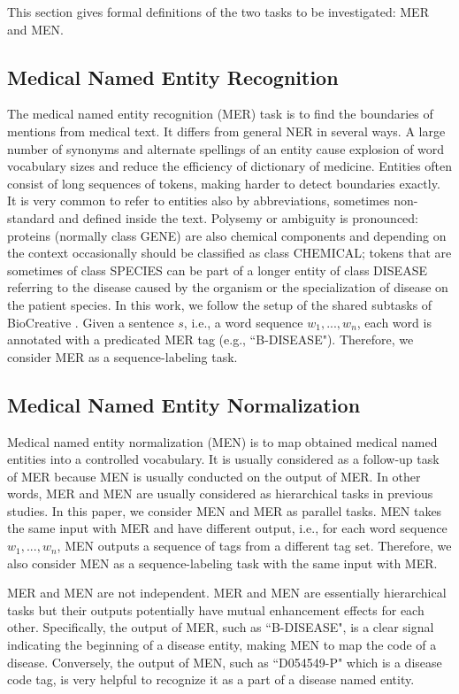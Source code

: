 This section gives formal definitions of the two tasks to be investigated: MER and MEN.

\subsection{Medical Named Entity Recognition} 
The medical named entity recognition (MER) task is to find the boundaries of mentions from medical text. It differs from general NER in several ways. A large number of synonyms and alternate spellings of an entity cause explosion of word vocabulary sizes and reduce the efficiency of dictionary of medicine. Entities often consist of long sequences of tokens, making harder to detect boundaries exactly. It is very common to refer to entities also by abbreviations, sometimes non-standard and defined inside the text. Polysemy or ambiguity is pronounced: proteins (normally
class GENE) are also chemical components and depending on the context occasionally should be classified as class CHEMICAL; tokens that are sometimes of class SPECIES can be part of a longer entity of class DISEASE referring to the disease caused by the organism or the specialization of disease on the patient species.
In this work, we follow the setup of the shared subtasks of BioCreative \cite{Wei2015Overview}. Given a sentence $s$, i.e., a word sequence $w_1, ..., w_n$, each word is annotated with a predicated MER tag (e.g., ``B-DISEASE"). Therefore, we consider MER as a sequence-labeling task. 

\subsection{Medical Named Entity Normalization}
Medical named entity normalization (MEN) is to map obtained medical named entities into a controlled vocabulary. It
 is usually considered as a follow-up task of MER because MEN is usually conducted on the output of MER. In other words, MER and MEN are usually considered as hierarchical tasks in previous studies. In this paper, we consider MEN and MER as parallel tasks. MEN takes the same input with MER and have different output, i.e., for each word sequence $w_1, ..., w_n$, MEN outputs a sequence of tags from a different tag set. Therefore, we also consider MEN as a sequence-labeling task with the same input with MER. 
 
MER and MEN are not independent. MER and MEN are essentially hierarchical tasks but their outputs potentially have mutual enhancement effects for each other. Specifically, the output of MER, such as ``B-DISEASE", is a clear signal indicating the beginning of a disease entity, making MEN to map the code of a disease. Conversely,  the output of MEN, such as ``D054549-P" which is a disease code tag, is very helpful to recognize it as a part of a disease named entity.  